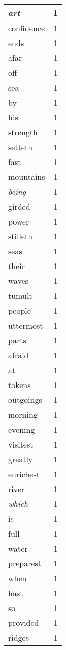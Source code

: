 \begin{center}
\begin{longtable}{l|r}
\emph{art} & 1 \\ \hline
confidence & 1 \\ \hline
ends & 1 \\ \hline
afar & 1 \\ \hline
off & 1 \\ \hline
sea & 1 \\ \hline
by & 1 \\ \hline
his & 1 \\ \hline
strength & 1 \\ \hline
setteth & 1 \\ \hline
fast & 1 \\ \hline
mountains & 1 \\ \hline
\emph{being} & 1 \\ \hline
girded & 1 \\ \hline
power & 1 \\ \hline
stilleth & 1 \\ \hline
seas & 1 \\ \hline
their & 1 \\ \hline
waves & 1 \\ \hline
tumult & 1 \\ \hline
people & 1 \\ \hline
uttermost & 1 \\ \hline
parts & 1 \\ \hline
afraid & 1 \\ \hline
at & 1 \\ \hline
tokens & 1 \\ \hline
outgoings & 1 \\ \hline
morning & 1 \\ \hline
evening & 1 \\ \hline
visitest & 1 \\ \hline
greatly & 1 \\ \hline
enrichest & 1 \\ \hline
river & 1 \\ \hline
\emph{which} & 1 \\ \hline
is & 1 \\ \hline
full & 1 \\ \hline
water & 1 \\ \hline
preparest & 1 \\ \hline
when & 1 \\ \hline
hast & 1 \\ \hline
so & 1 \\ \hline
provided & 1 \\ \hline
ridges & 1 \\ \hline

\end{longtable}
\end{center}
